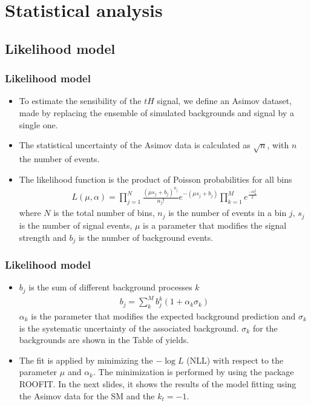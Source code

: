 \documentclass[11pt]{beamer}
\begin{document}
\section{Statistical analysis}

\begin{frame}
\subsection{Likelihood model}
\frametitle{Likelihood model}
{\small \begin{itemize}
\item To estimate the sensibility of the $tH$ signal, we define an Asimov dataset, made by replacing the ensemble of simulated backgrounds and signal by a single one. 
\item The statistical uncertainty of the Asimov data is calculated as $\sqrt{n}$, with $n$ the number of events.\\
\item The likelihood function is the product of Poisson probabilities for all bins
\begin{align}
	L(\mu,\alpha)=\prod_{j=1}^{N}\frac{(\mu s_j +b_j)^{n_j}}{n_j !}e^{-(\mu s_j+b_j)} \prod_{k=1}^M e^{\frac{-\alpha^2_k}{2}}
\end{align}
	where $N$ is the total number of bins, $n_j$ is the number of events in a bin $j$, $s_j$ is the number of signal events, $\mu$ is a parameter that modifies the signal strength and $b_j$ is the number of background events.
\end{itemize}}
\end{frame}


\begin{frame}
\frametitle{Likelihood model}
{\small
\begin{itemize}
	\item $b_j$ is the sum of different background processes $k$
	\begin{align}
	b_j=\sum_k^M b_j^k(1+ \alpha_k \sigma_k)
	\end{align}
	$\alpha_k$ is the parameter that modifies the expected background prediction and $\sigma_k$ is the systematic uncertainty of the associated background. $\sigma_k$ for the backgrounds are shown in the Table of yields. 
		\item The fit is applied by minimizing the $-\log{L}$ (NLL) with respect to the parameter $\mu$ and $\alpha_k$. The minimization is performed by using the package ROOFIT. In the next slides, it shows the results of the model fitting using the Asimov data for the SM and the $k_t=-1$.
\end{itemize}}
\end{frame}
\end{document}

